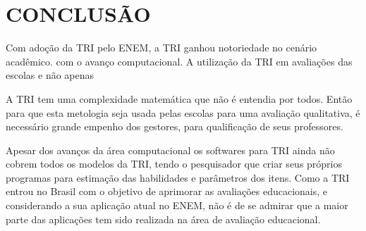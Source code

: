 \section{CONCLUSÃO}
    \par
    	Com adoção da TRI pelo ENEM, a TRI ganhou notoriedade no cenário acadêmico. com o avanço computacional. A utilização da TRI em avaliações das escolas e não apenas 
	\par
    	A TRI tem uma complexidade matemática que não é entendia por todos. Então para que esta metologia seja usada pelas escolas para uma avaliação qualitativa, é necessário grande empenho dos gestores, para qualificação de seus professores.
    \par
	    Apesar dos avanços da área computacional os softwares para TRI ainda não cobrem todos os modelos da TRI, tendo o pesquisador que criar seus próprios programas para estimação das habilidades e parâmetros dos itens. Como a TRI entrou no Brasil com o objetivo de aprimorar as avaliações educacionais, e considerando a sua aplicação atual no ENEM, não é de se admirar que a maior parte das aplicações tem sido realizada na área de avaliação educacional.
\newpage